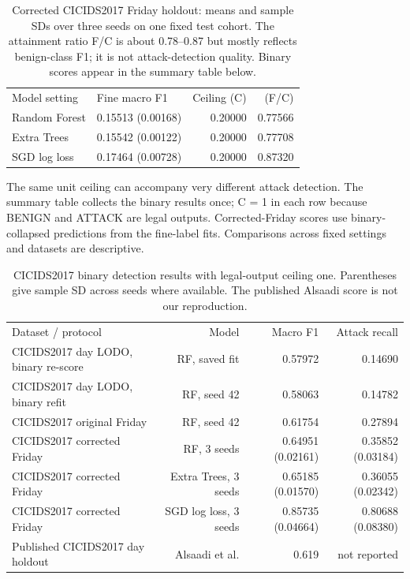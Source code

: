 \documentclass[namedate,webpdf,contemporary,large]{TBench-template}
\begin{document}
\begin{table}[h]\centering
\caption{Corrected CICIDS2017 Friday holdout: means and sample SDs over three seeds on one fixed test cohort. The attainment ratio F/C is about 0.78--0.87 but mostly reflects benign-class F1; it is not attack-detection quality. Binary scores appear in the summary table below.}
\label{tab:corrected-cic}
\begin{tabular}{p{4.2cm}p{3.3cm}rr}
Model setting & Fine macro F1 & Ceiling (C) & (F/C) \\
Random Forest & 0.15513 (0.00168) & 0.20000 & 0.77566 \\
Extra Trees & 0.15542 (0.00122) & 0.20000 & 0.77708 \\
SGD log loss & 0.17464 (0.00728) & 0.20000 & 0.87320 \\
\end{tabular}\end{table}

The same unit ceiling can accompany very different attack detection. The summary table collects the binary results once; C = 1 in each row because BENIGN and ATTACK are legal outputs. Corrected-Friday scores use binary-collapsed predictions from the fine-label fits. Comparisons across fixed settings and datasets are descriptive.

\begin{table}[h]\centering
\caption{CICIDS2017 binary detection results with legal-output ceiling one. Parentheses give sample SD across seeds where available. The published Alsaadi score is not our reproduction.}
\label{tab:unit-ceiling}
\begin{tabular}{lrrr}
Dataset / protocol & Model & Macro F1 & Attack recall \\
CICIDS2017 day LODO, binary re-score & RF, saved fit & 0.57972 & 0.14690 \\
CICIDS2017 day LODO, binary refit & RF, seed 42 & 0.58063 & 0.14782 \\
CICIDS2017 original Friday & RF, seed 42 & 0.61754 & 0.27894 \\
CICIDS2017 corrected Friday & RF, 3 seeds & 0.64951 (0.02161) & 0.35852 (0.03184) \\
CICIDS2017 corrected Friday & Extra Trees, 3 seeds & 0.65185 (0.01570) & 0.36055 (0.02342) \\
CICIDS2017 corrected Friday & SGD log loss, 3 seeds & 0.85735 (0.04664) & 0.80688 (0.08380) \\
Published CICIDS2017 day holdout & Alsaadi et al. \cite{alsaadi2026binary} & 0.619 & not reported \\
\end{tabular}\end{table}
\end{document}
